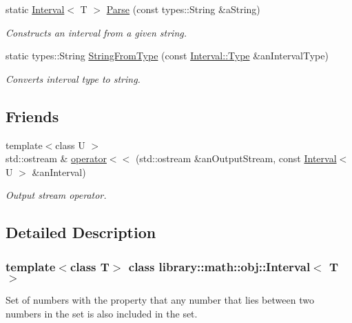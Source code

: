 \begin{DoxyCompactItemize}
static \hyperlink{classlibrary_1_1math_1_1obj_1_1_interval}{Interval}$<$ T $>$ \hyperlink{classlibrary_1_1math_1_1obj_1_1_interval_a9ed15c38ee04880a1aba75defa086a79}{Parse} (const types\+::\+String \&a\+String)
\begin{DoxyCompactList}\small\item\em Constructs an interval from a given string. \end{DoxyCompactList}\item 
static types\+::\+String \hyperlink{classlibrary_1_1math_1_1obj_1_1_interval_a64a1850152db9b95c9824c71378d9f40}{String\+From\+Type} (const \hyperlink{classlibrary_1_1math_1_1obj_1_1_interval_abc7177f1c446d8273e70c989953667d1}{Interval\+::\+Type} \&an\+Interval\+Type)
\begin{DoxyCompactList}\small\item\em Converts interval type to string. \end{DoxyCompactList}\end{DoxyCompactItemize}
\subsection*{Friends}
\begin{DoxyCompactItemize}
\item 
{\footnotesize template$<$class U $>$ }\\std\+::ostream \& \hyperlink{classlibrary_1_1math_1_1obj_1_1_interval_a3aa32afa8cb5d85eeb45540b0bf5657b}{operator$<$$<$} (std\+::ostream \&an\+Output\+Stream, const \hyperlink{classlibrary_1_1math_1_1obj_1_1_interval}{Interval}$<$ U $>$ \&an\+Interval)
\begin{DoxyCompactList}\small\item\em Output stream operator. \end{DoxyCompactList}\end{DoxyCompactItemize}


\subsection{Detailed Description}
\subsubsection*{template$<$class T$>$\newline
class library\+::math\+::obj\+::\+Interval$<$ T $>$}

Set of numbers with the property that any number that lies between two numbers in the set is also included in the set. 

